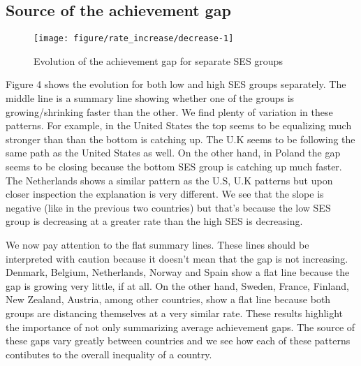 \documentclass[11pt, a4paper]{article}\usepackage[]{graphicx}\usepackage[]{color}
\begin{document}
\subsection{Source of the achievement gap}

\begin{figure}

{\centering \texttt{[image: figure/rate\_increase/decrease-1]} 

}

\caption[Evolution of the achievement gap for separate SES groups]{Evolution of the achievement gap for separate SES groups}\label{fig:rate_increase/decrease}
\end{figure}



Figure 4 shows the evolution for both low and high SES groups separately. The middle line is a summary line showing whether one of the groups is growing/shrinking faster than the other. We find plenty of variation in these patterns. For example, in the United States the top seems to be equalizing much stronger than than the bottom is catching up. The U.K seems to be following the same path as the United States as well. On the other hand, in Poland the gap seems to be closing because the bottom SES group is catching up much faster. The Netherlands shows a similar pattern as the U.S, U.K patterns but upon closer inspection the explanation is very different. We see that the slope is negative (like in the previous two countries) but that's because the low SES group is decreasing at a greater rate than the high SES is decreasing.

We now pay attention to the flat summary lines. These lines should be interpreted with caution because it doesn't mean that the gap is not increasing. Denmark, Belgium, Netherlands, Norway and Spain show a flat line because the gap is growing very little, if at all. On the other hand, Sweden, France, Finland, New Zealand, Austria, among other countries, show a flat line because both groups are distancing themselves at a very similar rate. These results highlight the importance of not only summarizing average achievement gaps. The source of these gaps vary greatly between countries and we see how each of these patterns contibutes to the overall inequality of a country.
\end{document}
